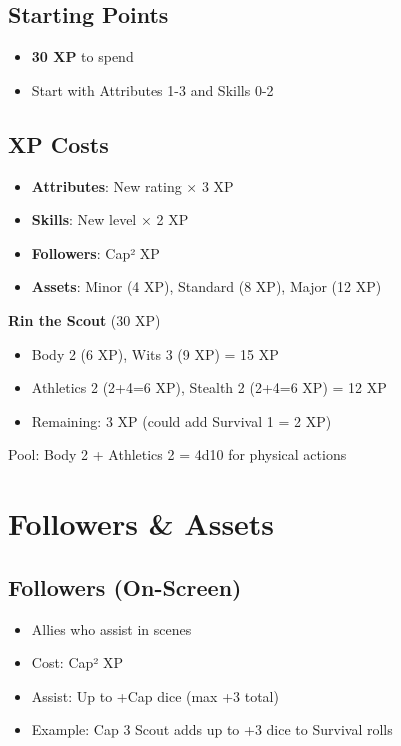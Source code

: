 \documentclass[11pt]{article}
\begin{document}
\subsection{Starting Points}
\begin{itemize}
    \item \textbf{30 XP} to spend
    \item Start with Attributes 1-3 and Skills 0-2
\end{itemize}

\subsection{XP Costs}
\begin{itemize}
    \item \textbf{Attributes}: New rating × 3 XP
    \item \textbf{Skills}: New level × 2 XP
    \item \textbf{Followers}: Cap² XP
    \item \textbf{Assets}: Minor (4 XP), Standard (8 XP), Major (12 XP)
\end{itemize}

\begin{examplebox}
\textbf{Rin the Scout} (30 XP)
\begin{itemize}
    \item Body 2 (6 XP), Wits 3 (9 XP) = 15 XP
    \item Athletics 2 (2+4=6 XP), Stealth 2 (2+4=6 XP) = 12 XP
    \item Remaining: 3 XP (could add Survival 1 = 2 XP)
\end{itemize}
Pool: Body 2 + Athletics 2 = 4d10 for physical actions
\end{examplebox}

\section{Followers \& Assets}

\subsection{Followers (On-Screen)}
\begin{itemize}
    \item Allies who assist in scenes
    \item Cost: Cap² XP
    \item Assist: Up to +Cap dice (max +3 total)
    \item Example: Cap 3 Scout adds up to +3 dice to Survival rolls
\end{itemize}
\end{document}
